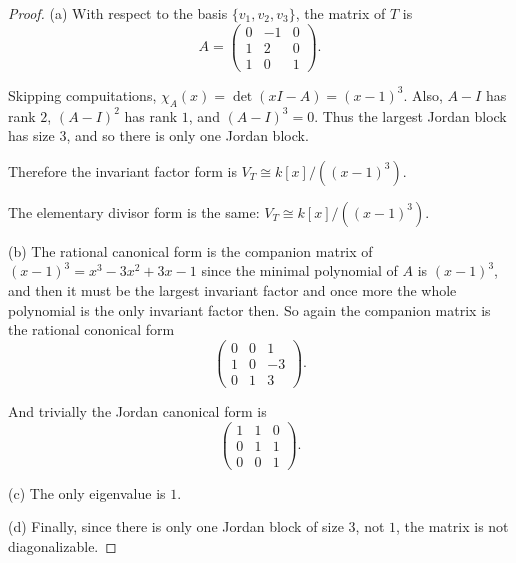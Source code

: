 \documentclass[addpoints,10pt]{exam}
\theoremstyle{plain}
\theoremstyle{definition}
\theoremstyle{plain}
\theoremstyle{plain}
\theoremstyle{definition}
\begin{document}
\begin{proof}(a)
With respect to the basis $\{v_1,v_2,v_3\}$, the matrix of $T$ is
\[
A=
\begin{pmatrix}
0&-1&0\\
1&2&0\\
1&0&1
\end{pmatrix}.
\]

Skipping compuitations,
$\chi_A(x)=\det(xI-A)=(x-1)^3$.
Also, $A-I$ has rank $2$, $(A-I)^2$ has rank $1$, and $(A-I)^3=0$.
Thus the largest Jordan block has size $3$, and so there is only one Jordan block.

Therefore the invariant factor form is
$V_T\cong k[x]/((x-1)^3)$.

The elementary divisor form is the same:
$V_T\cong k[x]/((x-1)^3)$.

(b) The rational canonical form is the companion matrix of
$(x-1)^3=x^3-3x^2+3x-1$ since the minimal polynomial of $A$ is $(x-1)^{3}$, and then it must be the largest invariant factor and once more the whole polynomial is the only invariant factor then. So again the companion matrix is the rational cononical form
\[
\begin{pmatrix}
0&0&1\\
1&0&-3\\
0&1&3
\end{pmatrix}.
\]

And trivially the Jordan canonical form is
\[
\begin{pmatrix}
1&1&0\\
0&1&1\\
0&0&1
\end{pmatrix}.
\]

(c) The only eigenvalue is $1$. 

(d) Finally, since there is only one Jordan block of size
$3$, not $1$, the matrix is not diagonalizable.

\end{proof}
\end{document}
